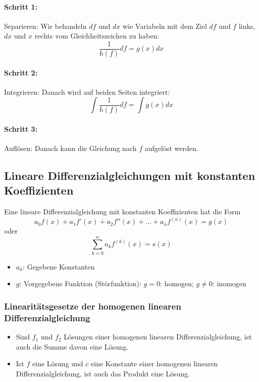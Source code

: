 \paragraph{Schritt 1:} Separieren: Wir behandeln $df$ und $dx$ wie Variabeln mit dem Ziel $df$ und $f$
links, $dx$ und $x$ rechts vom Gleichheitszeichen zu haben:
\[ \frac{1}{h(f)} df = g(x) dx \]

\paragraph{Schritt 2:} Integrieren: Danach wird auf beiden Seiten integriert:
\[ \int \frac{1}{h(f)} df = \int g(x) dx \]

\paragraph{Schritt 3:} Auflösen: Danach kann die Gleichung nach $f$ aufgelöst werden.

\subsection{Lineare Differenzialgleichungen mit konstanten Koeffizienten}
Eine lineare Differenzialgleichung mit konstanten Koeffizienten hat die Form
\[ a_{0}f(x) + a_{1}f'(x) + a_{2}f''(x) + \dots + a_{n}f^{(n)}(x) = g(x) \]
oder
\[ \sum_{k=0}^{n} a_{k}f^{(k)}(x) = s(x) \]
\begin{itemize}
  \item $a_k$: Gegebene Konstanten
  \item $g$: Vorgegebene Funktion (Störfunktion): $g = 0$: homogen; $g \ne 0$: inomogen
\end{itemize}

\subsubsection{Linearitätsgesetze der homogenen linearen Differenzialgleichung}
\begin{itemize}
  \item Sind $f_1$ und $f_2$ Lösungen einer homogenen linearen
    Differenzialgleichung, ist auch die Summe davon eine Lösung.
  \item Ist $f$ eine Lösung und $c$ eine Konstante einer homogenen linearen
    Differenzialgleichung, ist auch das Produkt eine Lösung.
\end{itemize}

